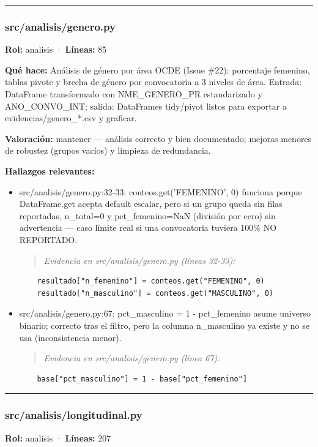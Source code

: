 \medskip
\hrule

\subsubsection{src/analisis/genero.py}
\textbf{Rol:} analisis · \textbf{Líneas:} 85

\textbf{Qué hace:} Análisis de género por área OCDE (Issue \#22): porcentaje femenino, tablas pivote y brecha de género por convocatoria a 3 niveles de área. Entrada: DataFrame transformado con NME\_GENERO\_PR estandarizado y ANO\_CONVO\_INT; salida: DataFrames tidy/pivot listos para exportar a evidencias/genero\_*.csv y graficar.

\textbf{Valoración:} mantener --- análisis correcto y bien documentado; mejoras menores de robustez (grupos vacíos) y limpieza de redundancia.

\textbf{Hallazgos relevantes:}
\begin{itemize}
  \item src/analisis/genero.py:32-33: conteos.get('FEMENINO', 0) funciona porque DataFrame.get acepta default escalar, pero si un grupo queda sin filas reportadas, n\_total=0 y pct\_femenino=NaN (división por cero) sin advertencia --- caso límite real si una convocatoria tuviera 100\% NO REPORTADO.
\begin{quote}\footnotesize\ttfamily
\noindent\emph{Evidencia en src/analisis/genero.py (líneas 32-33):}
\end{quote}
\begin{lstlisting}
    resultado["n_femenino"] = conteos.get("FEMENINO", 0)
    resultado["n_masculino"] = conteos.get("MASCULINO", 0)
\end{lstlisting}

  \item src/analisis/genero.py:67: pct\_masculino = 1 - pct\_femenino asume universo binario; correcto tras el filtro, pero la columna n\_masculino ya existe y no se usa (inconsistencia menor).
\begin{quote}\footnotesize\ttfamily
\noindent\emph{Evidencia en src/analisis/genero.py (línea 67):}
\end{quote}
\begin{lstlisting}
    base["pct_masculino"] = 1 - base["pct_femenino"]
\end{lstlisting}

\end{itemize}

\medskip
\hrule

\subsubsection{src/analisis/longitudinal.py}
\textbf{Rol:} analisis · \textbf{Líneas:} 207

